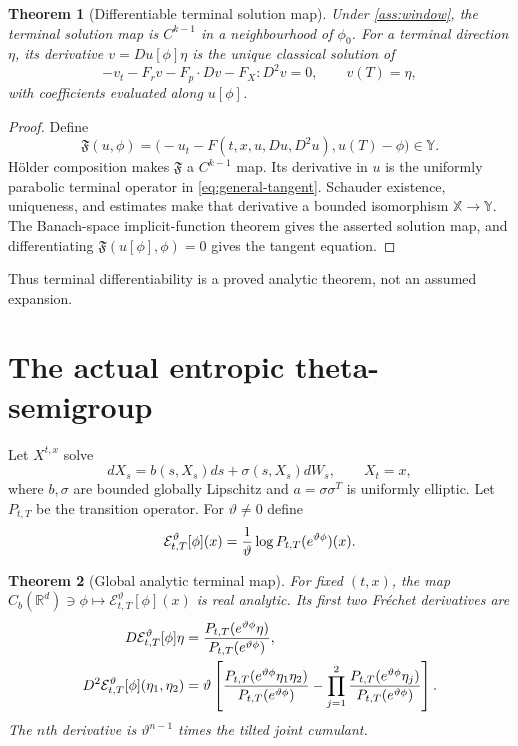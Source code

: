 \documentclass[11pt,reqno]{amsart}
\newtheorem{theorem}{Theorem}[section]
\theoremstyle{definition}
\theoremstyle{remark}
\newcommand{\R}{\mathbb R}
\newcommand{\cE}{\mathcal E}
\begin{document}
\begin{theorem}[Differentiable terminal solution map]\label{thm:IFT}
Under \cref{ass:window}, the terminal solution map is $C^{k-1}$ in a
neighbourhood of $\phi_0$.  For a terminal direction $\eta$, its derivative
$v=Du[\phi]\eta$ is the unique classical solution of
\begin{equation}\label{eq:general-tangent}
 -v_t-F_rv-F_p\cdot Dv-F_X:D^2v=0,
 \qquad v(T)=\eta,
\end{equation}
with coefficients evaluated along $u[\phi]$.
\end{theorem}

\begin{proof}
Define
\[
 \mathfrak F(u,\phi)=
 \bigl(-u_t-F(t,x,u,Du,D^2u),u(T)-\phi\bigr)
 \in\mathbb Y.
\]
H\"older composition makes $\mathfrak F$ a $C^{k-1}$ map.  Its derivative in
$u$ is the uniformly parabolic terminal operator in
\eqref{eq:general-tangent}.  Schauder existence, uniqueness, and estimates
make that derivative a bounded isomorphism $\mathbb X\to\mathbb Y$.  The
Banach-space implicit-function theorem gives the asserted solution map, and
differentiating $\mathfrak F(u[\phi],\phi)=0$ gives the tangent equation.
\end{proof}

Thus terminal differentiability is a proved analytic theorem, not an assumed
expansion.

\section{The actual entropic theta-semigroup}\label{sec:entropic}
Let $X^{t,x}$ solve
\begin{equation}\label{eq:forward}
 dX_s=b(s,X_s)ds+\sigma(s,X_s)dW_s,
 \qquad X_t=x,
\end{equation}
where $b,\sigma$ are bounded globally Lipschitz and
$a=\sigma\sigma^T$ is uniformly elliptic.  Let $P_{t,T}$ be the transition
operator.  For $\vartheta\ne0$ define
\begin{equation}\label{eq:theta}
 \cE_{t,T}^{\vartheta}[\phi](x)
 ={1\over\vartheta}\log P_{t,T}(e^{\vartheta\phi})(x).
\end{equation}

\begin{theorem}[Global analytic terminal map]\label{thm:analytic}
For fixed $(t,x)$, the map
$C_b(\R^d)\ni\phi\mapsto\cE_{t,T}^{\vartheta}[\phi](x)$ is real analytic.
Its first two Fr\'echet derivatives are
\begin{align}
 D\cE_{t,T}^{\vartheta}[\phi]\eta
 &={P_{t,T}(e^{\vartheta\phi}\eta)
    \over P_{t,T}(e^{\vartheta\phi})},
 \label{eq:D1}\\
 D^2\cE_{t,T}^{\vartheta}[\phi](\eta_1,\eta_2)
 &=\vartheta\left[
 {P_{t,T}(e^{\vartheta\phi}\eta_1\eta_2)
  \over P_{t,T}(e^{\vartheta\phi})}
 -\prod_{j=1}^2
 {P_{t,T}(e^{\vartheta\phi}\eta_j)
  \over P_{t,T}(e^{\vartheta\phi})}
 \right].
 \label{eq:D2}
\end{align}
The $n$th derivative is $\vartheta^{n-1}$ times the tilted joint cumulant.
\end{theorem}
\end{document}
